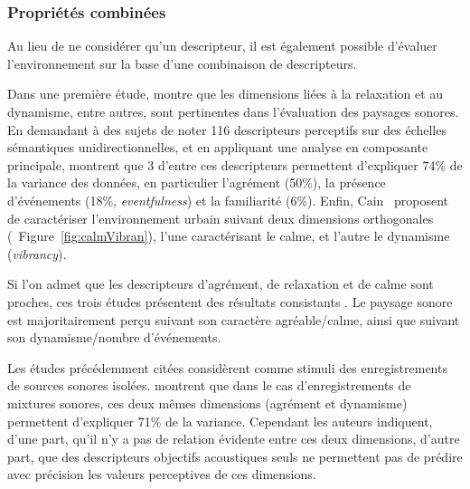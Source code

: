 {\subsubsection{Propriétés combinées}

Au lieu de ne considérer qu'un descripteur, il est également possible d'évaluer l'environnement sur la base d'une combinaison de descripteurs.

Dans une première étude, \citep{kang2006urban} montre que les dimensions liées à la relaxation et au dynamisme, entre autres, sont pertinentes dans l'évaluation des paysages sonores. En demandant à des sujets de noter 116 descripteurs perceptifs sur des échelles sémantiques unidirectionnelles, et en appliquant une analyse en composante principale, \citep{axelsson2010principal} montrent que 3 d'entre ces descripteurs permettent d'expliquer 74\% de la variance des données, en particulier l'agrément (50\%), la présence d'événements (18\%, \emph{eventfulness}) et la familiarité (6\%). Enfin, Cain~\al \citep{cain2013development} proposent de caractériser l'environnement urbain suivant deux dimensions orthogonales (\cf~Figure~\ref{fig:calmVibran}), l'une caractérisant le calme, et l'autre le dynamisme (\emph{vibrancy}).

Si l'on admet que les descripteurs d'agrément, de relaxation et de calme sont proches, ces trois études présentent des résultats consistants \citep{davies2013perception}. Le paysage sonore est majoritairement perçu suivant son caractère agréable/calme, ainsi que suivant son dynamisme/nombre d'événements.
 
Les études précédemment citées considèrent comme stimuli des enregistrements de sources sonores isolées. \citep{hall2013exploratory} montrent que dans le cas d'enregistrements de mixtures sonores, ces deux mêmes dimensions (agrément et dynamisme) permettent d'expliquer 71\% de la variance. Cependant les auteurs indiquent, d'une part, qu'il n'y a pas de relation évidente entre ces deux dimensions, d'autre part, que des descripteurs objectifs acoustiques seuls ne permettent pas de prédire avec précision les valeurs perceptives de ces dimensions.
 
}
